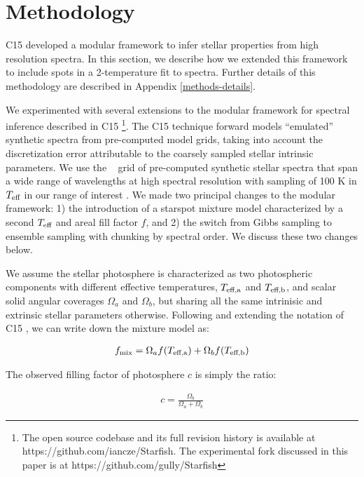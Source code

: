 \documentclass[twocolumn]{emulateapj}%
\newcommand{\iancze}{{\sc C15 }}
\begin{document}
\section{Methodology}\label{sec:methods} 

\iancze developed a modular framework to infer stellar properties from high resolution spectra.  In this section, we describe how we extended this framework to include spots in a 2-temperature fit to spectra.  Further details of this methodology are described in Appendix \ref{methods-details}.

We experimented with several extensions to the modular framework for spectral inference described in \iancze \footnote{The open source codebase and its full revision history is available at https://github.com/iancze/Starfish.  The experimental fork discussed in this paper is at https://github.com/gully/Starfish}.  The \iancze technique forward models ``emulated'' synthetic spectra from pre-computed model grids, taking into account the discretization error attributable to the coarsely sampled stellar intrinsic parameters.  We use the \PHOENIX~ grid of pre-computed synthetic stellar spectra that span a wide range of wavelengths at high spectral resolution with sampling of 100 K in $T_\textrm{eff}$ in our range of interest \citep{husser13}.   We made two principal changes to the modular framework: 1) the introduction of a starspot mixture model characterized by a second $T_\textrm{eff}$ and areal fill factor $f$, and 2) the switch from Gibbs sampling to ensemble sampling with chunking by spectral order.  We discuss these two changes below.

We assume the stellar photosphere is characterized as two photospheric components with different effective temperatures, $T_\textrm{eff,a}$ and $T_\textrm{eff,b}$, and scalar solid angular coverages $\Omega_a$ and $\Omega_b$, but sharing all the same intrinisic and extrinsic stellar parameters otherwise.  Following and extending the notation of \iancze, we can write down the mixture model as:

\begin{eqnarray} \label{eqn:mix_M}
f_{\mathrm{mix}} = \Omega_a f(T_\textrm{eff,a})  + \Omega_b f(T_\textrm{eff,b})
\end{eqnarray}

The observed filling factor of photosphere $c$ is simply the ratio:

\begin{eqnarray} \label{eqn:fill_factor}
c = \frac{\Omega_b}{\Omega_a + \Omega_b}
\end{eqnarray}
\end{document}

